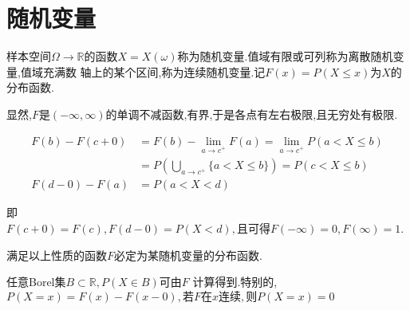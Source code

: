 \section{随机变量}
样本空间$ \Omega \rightarrow \mathbb{R}$的函数$ X = X(\omega)$称为随机变量.值域有限或可列称为离散随机变量,值域充满数
轴上的某个区间,称为连续随机变量.记$ F(x) = P(X \le x)$为$ X$的分布函数.

显然,$ F$是$ (-\infty, \infty)$的单调不减函数,有界,于是各点有左右极限,且无穷处有极限.

\begin{equation*}
\begin{split} 
	 F(b) - F(c + 0) & = F(b) - \lim \limits_{a \to c^{+}} F(a) =\lim \limits_{a \to c^{+}}P(a < X \le b) \\
	                 & = P(\bigcup_{a \to c^{+}}\{a < X \le b\}) = P(c < X \le b)                         \\
	 F(d - 0) - F(a) & = P(a < X < d)
\end{split}
\end{equation*}

即$ F(c + 0) = F(c), F(d - 0) = P(X<d), 且可得F(-\infty) = 0, F(\infty) = 1$.

满足以上性质的函数$ F$必定为某随机变量的分布函数.

任意Borel集$ B\subset \mathbb{R}, P(X \in B) 可由F$ 计算得到.特别的,$ P(X=x) = F(x) - F(x - 0),若F在x连续,则P(X=x) = 0$
